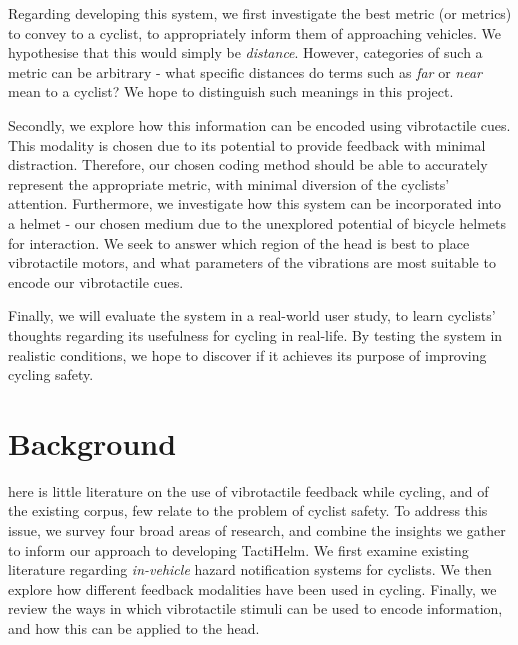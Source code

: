 \documentclass{mpaper}
\begin{document}
Regarding developing this system, we first investigate the best metric (or metrics) to convey to a cyclist, to appropriately inform them of approaching vehicles. We hypothesise that this would simply be \textit{distance}. However, categories of such a metric can be arbitrary - what specific distances do terms such as \textit{far} or \textit{near} mean to a cyclist? We hope to distinguish such meanings in this project.

Secondly, we explore how this information can be encoded using vibrotactile cues. This modality is chosen due to its potential to provide feedback with minimal distraction. Therefore, our chosen coding method should be able to accurately represent the appropriate metric, with minimal diversion of the cyclists' attention. Furthermore, we investigate how this system can be incorporated into a helmet - our chosen medium due to the unexplored potential of bicycle helmets for interaction. We seek to answer which region of the head is best to place vibrotactile motors, and what parameters of the vibrations are most suitable to encode our vibrotactile cues.

Finally, we will evaluate the system in a real-world user study, to learn cyclists' thoughts regarding its usefulness for cycling in real-life. By testing the system in realistic conditions, we hope to discover if it achieves its purpose of improving cycling safety.

\section{Background}

here is little literature on the use of vibrotactile feedback while cycling, and of the existing corpus, few relate to the problem of cyclist safety. To address this issue, we survey four broad areas of research, and combine the insights we gather to inform our approach to developing TactiHelm. We first examine existing literature regarding \textit{in-vehicle} hazard notification systems for cyclists. We then explore how different feedback modalities have been used in cycling. Finally, we review the ways in which vibrotactile stimuli can be used to encode information, and how this can be applied to the head.
\end{document}
